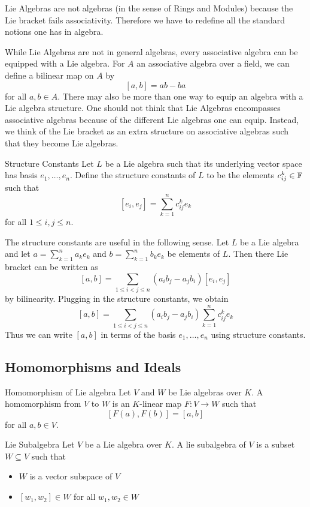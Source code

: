 \documentclass[a4paper]{article}
\begin{document}
Lie Algebras are not algebras (in the sense of Rings and Modules) because the Lie bracket fails associativity. Therefore we have to redefine all the standard notions one has in algebra. 

While Lie Algebras are not in general algebras, every associative algebra can be equipped with a Lie algebra. For $A$ an associative algebra over a field, we can define a bilinear map on $A$ by $$[a,b]=ab-ba$$ for all $a,b\in A$. There may also be more than one way to equip an algebra with a Lie algebra structure. One should not think that Lie Algebras encompasses associative algebras because of the different Lie algebras one can equip. Instead, we think of the Lie bracket as an extra structure on associative algebras such that they become Lie algebras. 

\begin{defn}{Structure Constants}{} Let $L$ be a Lie algebra such that its underlying vector space has basis $e_1,\dots,e_n$. Define the structure constants of $L$ to be the elements $c_{ij}^k\in\mathbb{F}$ such that $$[e_i,e_j]=\sum_{k=1}^nc_{ij}^ke_k$$ for all $1\leq i,j\leq n$. 
\end{defn}

The structure constants are useful in the following sense. Let $L$ be a Lie algebra and let $a=\sum_{k=1}^na_ke_k$ and $b=\sum_{k=1}^nb_ke_k$ be elements of $L$. Then there Lie bracket can be written as $$[a,b]=\sum_{1\leq i<j\leq n}(a_ib_j-a_jb_i)[e_i,e_j]$$ by bilinearity. Plugging in the structure constants, we obtain $$[a,b]=\sum_{1\leq i<j\leq n}(a_ib_j-a_jb_i)\sum_{k=1}^nc_{ij}^ke_k$$ Thus we can write $[a,b]$ in terms of the basis $e_1,\dots,e_n$ using structure constants. 

\subsection{Homomorphisms and Ideals}
\begin{defn}{Homomorphism of Lie algebra}{} Let $V$ and $W$ be Lie algebras over $K$. A homomorphism from $V$ to $W$ is an $K$-linear map $F:V\to W$ such that $$[F(a),F(b)]=[a,b]$$ for all $a,b\in V$. 
\end{defn}

\begin{defn}{Lie Subalgebra}{} Let $V$ be a Lie algebra over $K$. A lie subalgebra of $V$ is a subset $W\subseteq V$ such that 
\begin{itemize}
\item $W$ is a vector subspace of $V$
\item $[w_1,w_2]\in W$ for all $w_1,w_2\in W$
\end{itemize}
\end{defn}
\end{document}
